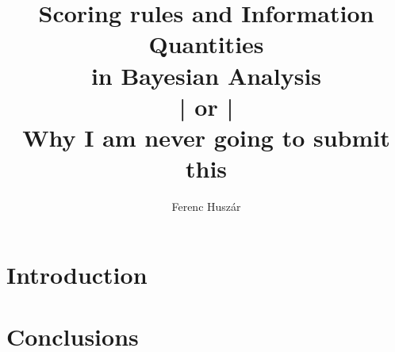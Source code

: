 \documentclass[11pt]{book}
\title{Scoring rules and Information Quantities\\in Bayesian Analysis \\ | or | \\ Why I am never going to submit this}
\author{Ferenc Husz\'{a}r}
\makeatletter
\theoremstyle{definition}
\newcommand{\ChapterOutsidePart}{%
   \def\toclevel@chapter{-1}\def\toclevel@section{0}\def\toclevel@subsection{1}}
\newcommand{\ChapterInsidePart}{%
   \def\toclevel@chapter{0}\def\toclevel@section{1}\def\toclevel@subsection{2}}
\makeatother
\begin{document}
\maketitle

\ChapterOutsidePart 
{}
\tableofcontents

\chapter{Introduction}


\ChapterInsidePart




\ChapterOutsidePart
\chapter{Conclusions}

\lipsum[1]



\end{document}
